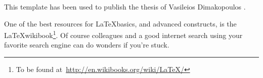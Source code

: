 This template has been used to publish the thesis of Vasileios Dimakopoulos  . 

One of the best resources for \LaTeX basics, and advanced constructs, is the \LaTeX wikibook\footnote{To be found at~\url{http://en.wikibooks.org/wiki/LaTeX/}}. Of course colleagues and a good internet search using your favorite search engine can do wonders if you're stuck. 
